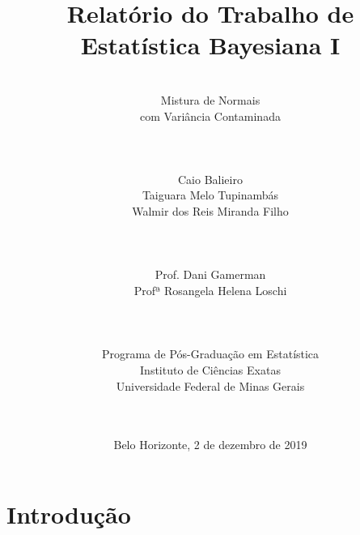 \documentclass[12pt,reqno,a4paper,oneside]{report}
\begin{document}
\title{\huge Relatório do Trabalho de\\
	Estatística Bayesiana I}
\author{\\
	\huge Mistura de Normais\\
	\huge com Variância Contaminada
	\\
	\\
	\\
	\\
	\Large Caio Balieiro\\
	\Large Taiguara Melo Tupinambás\\
	\Large Walmir dos Reis Miranda Filho\\
	\\
	\\
	\\
	\Large Prof. Dani Gamerman\\
	\Large Profª Rosangela Helena Loschi\\
	\\
	\\
	\\
	Programa de Pós-Graduação em Estatística\\
	Instituto de Ciências Exatas\\
	Universidade Federal de Minas Gerais\\
	\\
	\\}
\date{Belo Horizonte, 2 de dezembro de 2019}
\maketitle

\section*{\Large Introdução}

\end{document}
